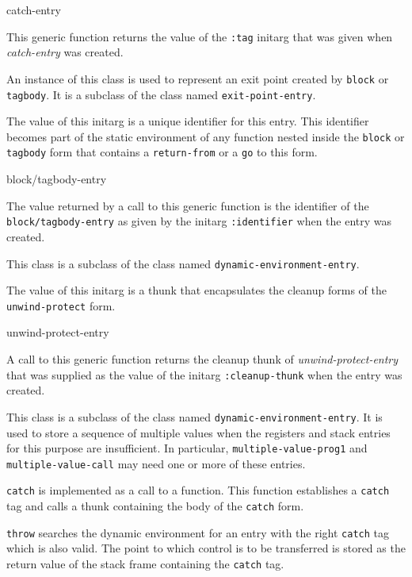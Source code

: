  {catch-entry}

This generic function returns the value of the \texttt{:tag} initarg
that was given when \textit{catch-entry} was created.


An instance of this class is used to represent an exit point created
by \texttt{block} or \texttt{tagbody}.  It is a subclass of the class
named \texttt{exit-point-entry}.


The value of this initarg is a unique identifier for this entry.  This
identifier becomes part of the static environment of any function
nested inside the \texttt{block} or \texttt{tagbody} form that
contains a \texttt{return-from} or a \texttt{go} to this form.

 {block/tagbody-entry}

The value returned by a call to this generic function is the
identifier of the \texttt{block/tagbody-entry} as given by the initarg
\texttt{:identifier} when the entry was created.


This class is a subclass of the class named
\texttt{dynamic-environment-entry}.


The value of this initarg is a thunk that encapsulates the cleanup
forms of the \texttt{unwind-protect} form.

 {unwind-protect-entry}

A call to this generic function returns the cleanup thunk of
\textit{unwind-protect-entry} that was supplied as the value of the
initarg \texttt{:cleanup-thunk} when the entry was created.


This class is a subclass of the class named
\texttt{dynamic-environment-entry}.  It is used to store a sequence of
multiple values when the registers and stack entries for this purpose
are insufficient.  In particular, \texttt{multiple-value-prog1} and
\texttt{multiple-value-call} may need one or more of these entries.

\texttt{catch} is implemented as a call to a function.  This function
establishes a \texttt{catch} tag and calls a thunk containing the body
of the \texttt{catch} form.

\texttt{throw} searches the dynamic environment for an entry with the
right \texttt{catch} tag which is also valid.  The point to which
control is to be transferred is stored as the return value of the
stack frame containing the \texttt{catch} tag.

